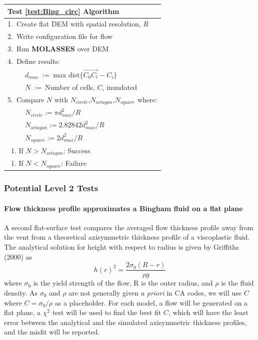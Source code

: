 \documentclass[12pt,letter]{article}
\newcommand{\tabitem}{~~\llap{\textbullet}~~}
\newcommand{\tabitem}{~~\llap{\textbullet}~~}
\begin{document}
			\begin{center}
				\begin{tabular}{l}
					\toprule
					\textbf{Test \ref{test:Bing_circ} Algorithm}\\
					\midrule
					1.~Create flat DEM with spatial resolution, $R$\\
					2.~Write configuration file for flow\\
					3.~Run \textbf{MOLASSES} over DEM\\
					4.~Define results:\\
						~\tabitem $d_{max}$~:=~max dist$\{\overrightarrow{C_0C_l}-C_i\}$\\
						~\tabitem $N$~:=~Number of cells, $C$, inundated\\
					5.~Compare $N$ with $N_{circle}$,$N_{octagon}$,$N_{square}$ where:\\
						~\tabitem $N_{circle}:=\pi d_{max}^2/R$\\
						~\tabitem $N_{octagon}:=2.82842 d_{max}^2/R$\\
						~\tabitem $N_{square}:=2d_{max}^2/R$\\
						~1. If $N>N_{octagon}$: Success\\
						~1. If $N<N_{square}$: Failure\\
					\bottomrule
				\end{tabular}
			\end{center}


		\subsubsection{Potential Level 2 Tests}
			\paragraph{Flow thickness profile approximates a Bingham fluid on a flat plane}
				A second flat-surface test compares the averaged flow thickness profile away from the vent from a theoretical axisymmetric thickness profile of a viscoplastic fluid. The analytical solution for height with respect to radius is given by Griffiths (2000) as
				\begin{equation}
					h(r)^2 = \frac{2\sigma_0(R-r)}{\rho g}
				\end{equation}
				where $\sigma_0$ is the yield strength of the flow, R is the outer radius, and $\rho$ is the fluid density. As $\sigma_0$ and $\rho$ are not generally given \textit{a priori} in CA codes, we will use $C$ where $C=\sigma_0/\rho$ as a placeholder. For each model, a flow will be generated on a flat plane, a $\chi^2$ test will be used to find the best fit $C$, which will have the least error between the analytical and the simulated axisymmetric thickness profiles, and the misfit will be reported.
\end{document}
